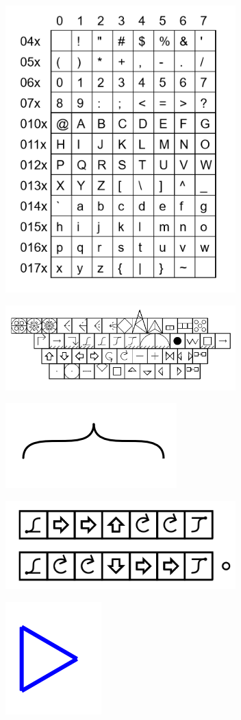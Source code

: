 \documentclass[11pt]{article}
\begin{document}
\includegraphics[width=3.5in]{image25.png}

\includegraphics[width=3.5in]{image26.png}

\includegraphics{image27.png}

\includegraphics[width=3.5in]{image28.png}

\includegraphics{image29.png}
\end{document}
